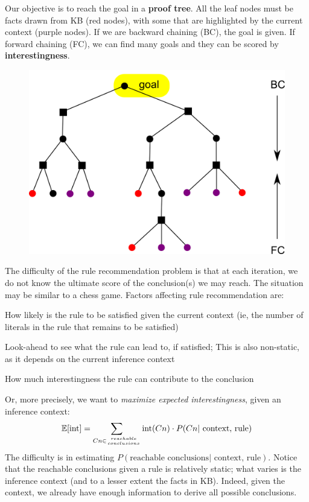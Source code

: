 Our objective is to reach the goal in a \textbf{proof tree}.  All the leaf nodes must be facts drawn from KB (red nodes), with some that are highlighted by the current context (purple nodes).  If we are backward chaining (BC), the goal is given.  If forward chaining (FC), we can find many goals and they can be scored by \textbf{interestingness}.
\begin{figure}[H]
\centering
\includegraphics[scale=1]{proof-tree.png}
\end{figure}

The difficulty of the rule recommendation problem is that at each iteration, we do not know the ultimate score of the conclusion(s) we may reach.  The situation may be similar to a chess game.  Factors affecting rule recommendation are:
\begin{compactenum-}
\item How likely is the rule to be satisfied given the current context (ie, the number of literals in the rule that remains to be satisfied)
\item Look-ahead to see what the rule can lead to, if satisfied;  This is also non-static, as it depends on the current inference context
\item How much interestingness the rule can contribute to the conclusion
\end{compactenum-}
Or, more precisely, we want to \textit{maximize expected interestingness}, given an inference context:
$$ \mathbb{E}[ \mbox{int} ] = \sum_{Cn \in {reachable \atop conclusions}} \mbox{int}(Cn) \cdot P(Cn | \mbox{ context, rule})  $$
The difficulty is in estimating $P(\mbox{reachable conclusions} | \mbox{ context, rule})$.  Notice that the reachable conclusions given a rule is relatively static;  what varies is the inference context (and to a lesser extent the facts in KB).  Indeed, given the context, we already have enough information to derive all possible conclusions.

